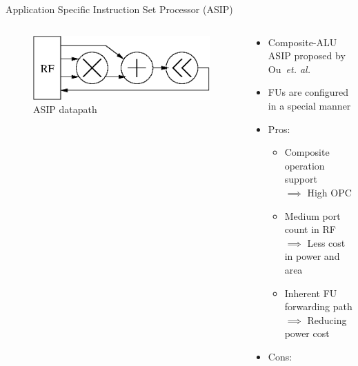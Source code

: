 \documentclass[handout]{beamer}
\begin{document}
\begin{CJK}{UTF8}{bkai}
            \begin{frame}{Application Specific Instruction Set Processor (ASIP)}
                \begin{columns}
                    \begin{column}{0.45\textwidth}
                        \begin{figure}[!ht]
                            \centering
                            \includegraphics[width=0.9\linewidth]{./figs/cascade.eps}
                            \caption{ASIP datapath}
                        \end{figure}
                    \end{column}
                    \begin{column}{0.6\textwidth}
                        \vspace{-0.5em}
                        \begin{itemize}
                            \item <2-> {Composite-ALU ASIP proposed by Ou~\textit{et. al.}\footnotemark}
                            \item <3-> {FUs are configured in a special manner}
                            \item <4-> {Pros:
                                \begin{itemize}
                                    \item Composite operation support \\ $\implies$ High OPC
                                    \item Medium port count in RF \\ $\implies$ Less cost in power and area
                                    \item Inherent FU forwarding path \\ $\implies$ Reducing power cost
                                \end{itemize}
                                }
                            \item <5-> {Cons:
                                \begin{itemize}

\end{itemize}}
\end{itemize}
\end{column}
\end{columns}
\end{frame}
\end{CJK}
\end{document}
